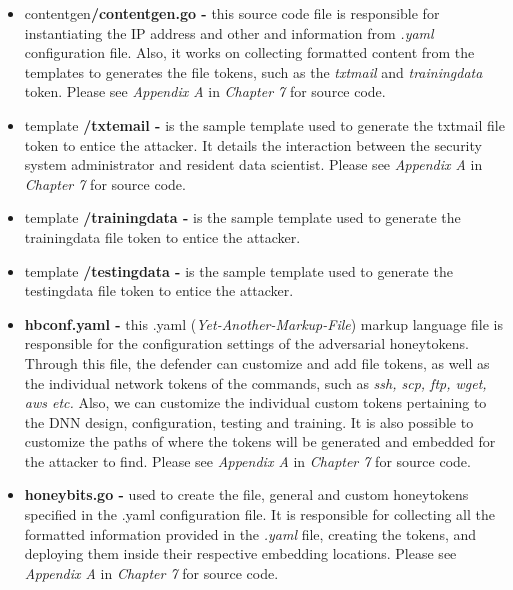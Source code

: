 \documentclass[grad,lot,lof,11pt,oneside,onehalfspace]{RUthesis}
\begin{document}
\begin{itemize}
	\item contentgen\textbf{/contentgen.go -} this source code file is responsible for instantiating the IP address and other and information from \textit{.yaml} configuration file. Also, it works on collecting formatted content from the templates to generates the file tokens, such as the \textit{txtmail} and \textit{trainingdata} token. Please see \textit{Appendix A} in \textit{Chapter 7} for source code. 
	\item template \textbf{/txtemail -} is the sample template used to generate the txtmail file token to entice the attacker. It details the interaction between the security system administrator and resident data scientist. Please see \textit{Appendix A} in \textit{Chapter 7} for source code.
    \item template \textbf{/trainingdata -} is the sample template used to generate the trainingdata file token to entice the attacker. 
    \item template \textbf{/testingdata -} is the sample template used to generate the testingdata file token to entice the attacker.
    \item \textbf{hbconf.yaml -} this .yaml (\textit{Yet-Another-Markup-File}) markup language file is responsible for the configuration settings of the adversarial honeytokens. Through this file, the defender can customize and add file tokens, as well as the individual network tokens of the commands, such as \textit{ssh, scp, ftp, wget, aws etc.} Also, we can customize the individual custom tokens pertaining to the DNN design, configuration, testing and training.  It is also possible to customize the paths of where the tokens will be generated and embedded for the attacker to find. Please see \textit{Appendix A} in \textit{Chapter 7} for source code.
    \item \textbf{honeybits.go -} used to create the file, general and custom honeytokens specified in the .yaml configuration file. It is responsible for collecting all the formatted information provided in the \textit{.yaml} file, creating the tokens, and deploying them inside their respective embedding locations. Please see \textit{Appendix A} in \textit{Chapter 7} for source code.
\end{itemize}
\end{document}
